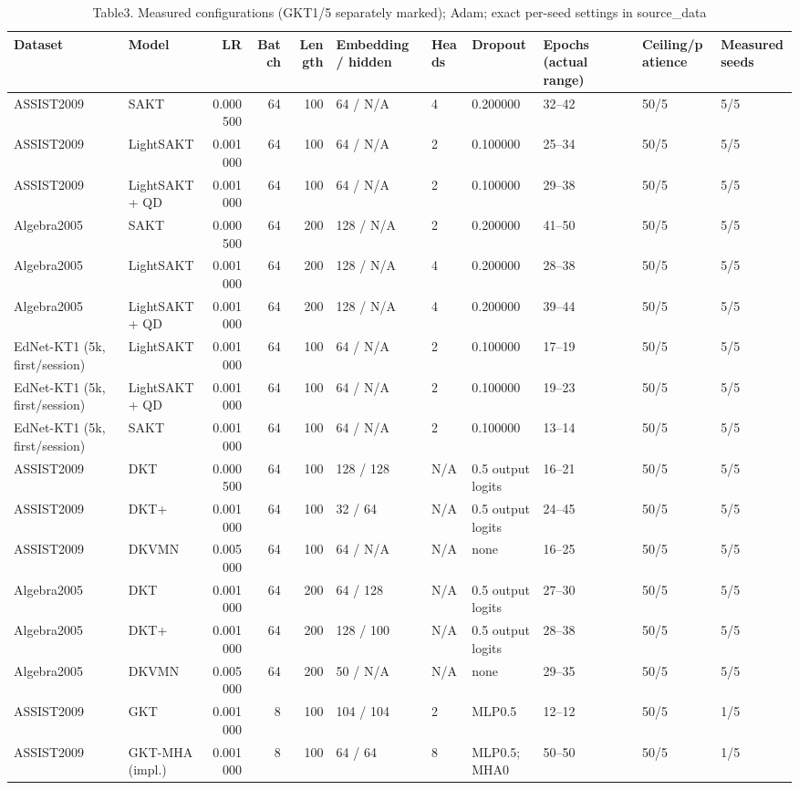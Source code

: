 \begin{table}
\caption{Table3. Measured configurations (GKT1/5 separately marked); Adam; exact per-seed settings in source_data}
\begin{tabular}{llrrrllllll}
\toprule
Dataset & Model & LR & Batch & Length & Embedding / hidden & Heads & Dropout & Epochs (actual range) & Ceiling/patience & Measured seeds \\
\midrule
ASSIST2009 & SAKT & 0.000500 & 64 & 100 & 64 / N/A & 4 & 0.200000 & 32–42 & 50/5 & 5/5 \\
ASSIST2009 & LightSAKT & 0.001000 & 64 & 100 & 64 / N/A & 2 & 0.100000 & 25–34 & 50/5 & 5/5 \\
ASSIST2009 & LightSAKT + QD & 0.001000 & 64 & 100 & 64 / N/A & 2 & 0.100000 & 29–38 & 50/5 & 5/5 \\
Algebra2005 & SAKT & 0.000500 & 64 & 200 & 128 / N/A & 2 & 0.200000 & 41–50 & 50/5 & 5/5 \\
Algebra2005 & LightSAKT & 0.001000 & 64 & 200 & 128 / N/A & 4 & 0.200000 & 28–38 & 50/5 & 5/5 \\
Algebra2005 & LightSAKT + QD & 0.001000 & 64 & 200 & 128 / N/A & 4 & 0.200000 & 39–44 & 50/5 & 5/5 \\
EdNet-KT1 (5k, first/session) & LightSAKT & 0.001000 & 64 & 100 & 64 / N/A & 2 & 0.100000 & 17–19 & 50/5 & 5/5 \\
EdNet-KT1 (5k, first/session) & LightSAKT + QD & 0.001000 & 64 & 100 & 64 / N/A & 2 & 0.100000 & 19–23 & 50/5 & 5/5 \\
EdNet-KT1 (5k, first/session) & SAKT & 0.001000 & 64 & 100 & 64 / N/A & 2 & 0.100000 & 13–14 & 50/5 & 5/5 \\
ASSIST2009 & DKT & 0.000500 & 64 & 100 & 128 / 128 & N/A & 0.5 output logits & 16–21 & 50/5 & 5/5 \\
ASSIST2009 & DKT+ & 0.001000 & 64 & 100 & 32 / 64 & N/A & 0.5 output logits & 24–45 & 50/5 & 5/5 \\
ASSIST2009 & DKVMN & 0.005000 & 64 & 100 & 64 / N/A & N/A & none & 16–25 & 50/5 & 5/5 \\
Algebra2005 & DKT & 0.001000 & 64 & 200 & 64 / 128 & N/A & 0.5 output logits & 27–30 & 50/5 & 5/5 \\
Algebra2005 & DKT+ & 0.001000 & 64 & 200 & 128 / 100 & N/A & 0.5 output logits & 28–38 & 50/5 & 5/5 \\
Algebra2005 & DKVMN & 0.005000 & 64 & 200 & 50 / N/A & N/A & none & 29–35 & 50/5 & 5/5 \\
ASSIST2009 & GKT & 0.001000 & 8 & 100 & 104 / 104 & 2 & MLP0.5 & 12–12 & 50/5 & 1/5 \\
ASSIST2009 & GKT-MHA (impl.) & 0.001000 & 8 & 100 & 64 / 64 & 8 & MLP0.5; MHA0 & 50–50 & 50/5 & 1/5 \\
\bottomrule
\end{tabular}
\end{table}
